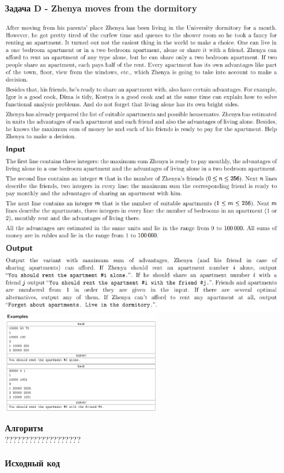 \documentclass[a4paper,12pt]{article}
\begin{document}
\newpage
\textbf{{\large Задача D - Zhenya moves from the dormitory}} \\
\begin{center}
\includegraphics[width=0.9\textwidth]{CT_ACM_EAST/CT_ACM_EAST_D1.png}\\ [1cm]
\includegraphics[width=0.5\textwidth]{CT_ACM_EAST/CT_ACM_EAST_D2.png}\\ [1cm]
\end{center}
\textbf{{\large Алгоритм}} \\
{\Huge ???????????????????} \\ 
\\
\newpage
\textbf{{\large Исходный код}}
\end{document}
